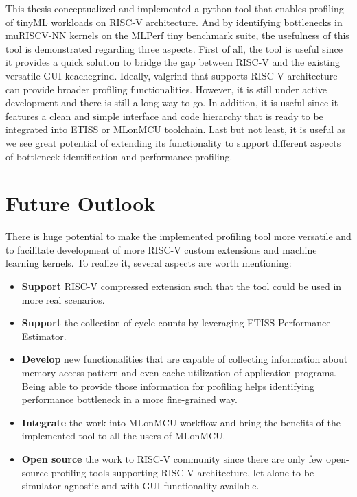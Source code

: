 This thesis conceptualized and implemented a python tool that enables profiling of tinyML workloads on RISC-V architecture. And by identifying bottlenecks in muRISCV-NN kernels on the MLPerf tiny benchmark suite, the usefulness of this tool is demonstrated regarding three aspects. First of all, the tool is useful since it provides a quick solution to bridge the gap between RISC-V and the existing versatile GUI kcachegrind. Ideally, valgrind that supports RISC-V architecture can provide broader profiling functionalities. However, it is still under active development and there is still a long way to go. In addition, it is useful since it features a clean and simple interface and code hierarchy that is ready to be integrated into ETISS or MLonMCU toolchain. Last but not least, it is useful as we see great potential of extending its functionality to support different aspects of bottleneck identification and performance profiling.

\section{Future Outlook}

There is huge potential to make the implemented profiling tool more versatile and to facilitate development of more RISC-V custom extensions and machine learning kernels. To realize it, several aspects are worth mentioning:

\begin{itemize}
    \item \textbf{Support} RISC-V compressed extension such that the tool could be used in more real scenarios.
    \item \textbf{Support} the collection of cycle counts by leveraging ETISS Performance Estimator.
    \item \textbf{Develop} new functionalities that are capable of collecting information about memory access pattern and even cache utilization of application programs. Being able to provide those information for profiling helps identifying performance bottleneck in a more fine-grained way.
    \item \textbf{Integrate} the work into MLonMCU workflow and bring the benefits of the implemented tool to all the users of MLonMCU. 
    \item \textbf{Open source} the work to RISC-V community since there are only few open-source profiling tools supporting RISC-V architecture, let alone to be simulator-agnostic and with GUI functionality available.  
\end{itemize}